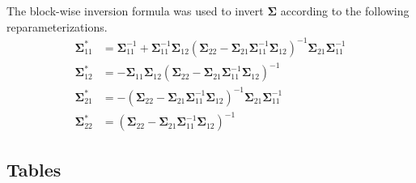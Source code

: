 \documentclass{article}
\begin{document}
The block-wise inversion formula was used to invert $\boldsymbol\Sigma$ according to the following reparameterizations.
\begin{align*}
\boldsymbol\Sigma_{11}^* & = \boldsymbol\Sigma_{11}^{-1} + \boldsymbol\Sigma_{11}^{-1}\boldsymbol\Sigma_{12}(\boldsymbol\Sigma_{22} - \boldsymbol\Sigma_{21}\boldsymbol\Sigma_{11}^{-1}\boldsymbol\Sigma_{12})^{-1}\boldsymbol\Sigma_{21}\boldsymbol\Sigma_{11}^{-1}\\
\boldsymbol\Sigma_{12}^* & = -\boldsymbol\Sigma_{11} \boldsymbol\Sigma_{12}(\boldsymbol\Sigma_{22}-\boldsymbol\Sigma_{21}\boldsymbol\Sigma_{11}^{-1}\boldsymbol\Sigma_{12})^{-1}\\
\boldsymbol\Sigma_{21}^* & = -(\boldsymbol\Sigma_{22} - \boldsymbol\Sigma_{21}\boldsymbol\Sigma_{11}^{-1}\boldsymbol\Sigma_{12})^{-1}\boldsymbol\Sigma_{21}\boldsymbol\Sigma_{11}^{-1}\\
\boldsymbol\Sigma_{22}^* & = (\boldsymbol\Sigma_{22} - \boldsymbol\Sigma_{21}\boldsymbol\Sigma_{11}^{-1}\boldsymbol\Sigma_{12})^{-1}     
\end{align*}

\newpage

\subsection*{Tables}
\end{document}
